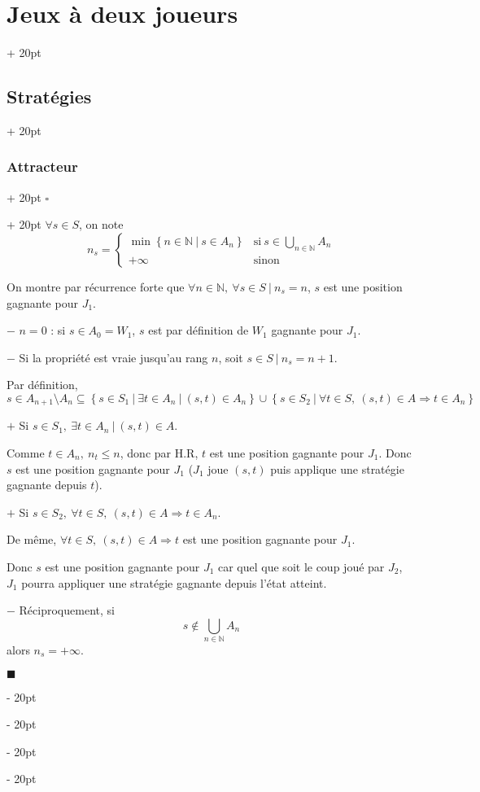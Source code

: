 \documentclass[a4paper, 12pt, twoside]{article}
\newcommand{\N}{\mathbb{N}} %
\newcommand{\set}[1]{\left\{ #1 \right\}}
\renewcommand{\le}{\leqslant}
\newcommand{\ind}[1][20pt]{\advance\leftskip + #1}
\newcommand{\deind}[1][20pt]{\advance\leftskip - #1}
\newenvironment{indt}[2][20pt]{#2 \par \ind[#1]}{\par \deind} %
\newenvironment{proof}[1][{}]{\begin{indt}{$\square$ #1}}{$\blacksquare$ \end{indt}}
\begin{document}
\begin{indt}{\section{Jeux à deux joueurs}}
\begin{indt}{\subsection{Stratégies}}
\begin{indt}{\subsubsection{Attracteur}}
                \begin{proof}
                    $\forall s \in S$, on note
                    \[
                        n_s =
                        \begin{cases}
                            \min\set{n \in \N\ |\ s \in A_n}
                            & \displaystyle \text{si}\ s \in \bigcup_{n \in \N} A_n
                            \\
                            +\infty
                            & \text{sinon}
                        \end{cases}
                    \]

                    On montre par récurrence forte que $\forall n \in \N,\ \forall s \in S\ |\ n_s = n$, $s$ est une position gagnante pour $J_1$.

                    $-$ $n = 0$ : si $s \in A_0 = W_1$, $s$ est par définition de $W_1$ gagnante pour $J_1$.

                    $-$ Si la propriété est vraie jusqu'au rang $n$, soit $s \in S\ |\ n_s = n + 1$.

                    Par définition,
                    \[
                        s \in A_{n + 1} \setminus A_n
                        \subseteq \set{s \in S_1\ |\ \exists t \in A_n\ |\ (s, t) \in A_n}
                        \cup \set{s \in S_2\ |\ \forall t \in S,\ (s, t) \in A \Rightarrow t \in A_n}
                    \]

                    $+$ Si $s \in S_1,\ \exists t \in A_n\ |\ (s, t) \in A$.

                    Comme $t \in A_n,\ n_t \le n$, donc par H.R, $t$ est une position gagnante pour $J_1$.
                    Donc $s$ est une position gagnante pour $J_1$ ($J_1$ joue $(s, t)$ puis applique une stratégie gagnante depuis $t$).

                    $+$ Si $s \in S_2,\ \forall t \in S,\ (s, t) \in A \Rightarrow t \in A_n$.

                    De même, $\forall t \in S,\ (s, t) \in A \Rightarrow t$ est une position gagnante pour $J_1$.

                    Donc $s$ est une position gagnante pour $J_1$ car quel que soit le coup joué par $J_2$, $J_1$ pourra appliquer une stratégie gagnante depuis l'état atteint.

                    \vspace{6pt}
                    
                    $-$ Réciproquement, si
                    \[
                        s \notin \bigcup_{n \in \N} A_n
                    \]
                    alors $n_s = +\infty$.


\end{proof}
\end{indt}
\end{indt}
\end{indt}
\end{document}
